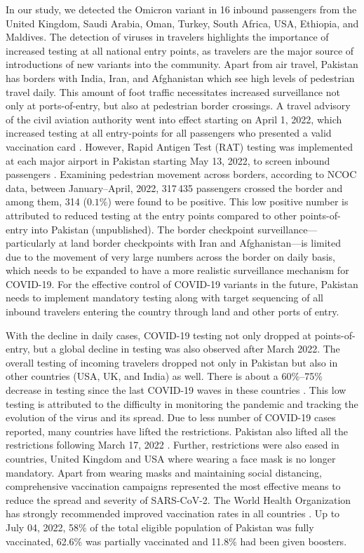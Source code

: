 In our study, we detected the Omicron variant in 16 inbound passengers from the United Kingdom, Saudi Arabia, Oman, Turkey, South Africa, USA, Ethiopia, and Maldives.
The detection of viruses in travelers highlights the importance of increased testing at all national entry points, as travelers are the major source of introductions of new variants into the community.
Apart from air travel, Pakistan has borders with India, Iran, and Afghanistan which see high levels of pedestrian travel daily.
This amount of foot traffic necessitates increased surveillance not only at ports-of-entry, but also at pedestrian border crossings.
A travel advisory of the civil aviation authority went into effect starting on April 1, 2022, which increased testing at all entry-points for all passengers who presented a valid vaccination card \cite{caapakistan-covid-guidelines}.
However, Rapid Antigen Test (RAT) testing was implemented at each major airport in Pakistan starting May 13, 2022, to screen inbound passengers \cite{brecorder-inbound-flights}.
Examining pedestrian movement across borders, according to NCOC data, between January--April, 2022, 317\,435 passengers crossed the border and among them, 314 ($0.1\%$) were found to be positive.
This low positive number is attributed to reduced testing at the entry points compared to other points-of-entry into Pakistan (unpublished).
The border checkpoint surveillance---particularly at land border checkpoints with Iran and Afghanistan---is limited due to the movement of very large numbers across the border on daily basis, which needs to be expanded to have a more realistic surveillance mechanism for COVID-19.
For the effective control of COVID-19 variants in the future, Pakistan needs to implement mandatory testing along with target sequencing of all inbound travelers entering the country through land and other ports of entry.

With the decline in daily cases, COVID-19 testing not only dropped at points-of-entry, but a global decline in testing was also observed after March 2022.
The overall testing of incoming travelers dropped not only in Pakistan but also in other countries (USA, UK, and India) as well.
There is about a 60\%--75\% decrease in testing since the last COVID-19 waves in these countries \cite{ourworldindata-covid-explorer}.
This low testing is attributed to the difficulty in monitoring the pandemic and tracking the evolution of the virus and its spread.
Due to less number of COVID-19 cases reported, many countries have lifted the restrictions.
Pakistan also lifted all the restrictions following March 17, 2022 \cite{business-standard-covid-curbs}.
Further, restrictions were also eased in countries, United Kingdom \cite{bbc-health-news} and USA \cite{cdc-mask-travel-guidance} where wearing a face mask is no longer mandatory.
Apart from wearing masks and maintaining social distancing, comprehensive vaccination campaigns represented the most effective means to reduce the spread and severity of SARS-CoV-2.
The World Health Organization has strongly recommended improved vaccination rates in all countries \cite{who-covid19-vaccine-advice}.
Up to July 04, 2022, 58\% of the total eligible population of Pakistan was fully vaccinated, 62.6\% was partially vaccinated and 11.8\% had been given boosters.

